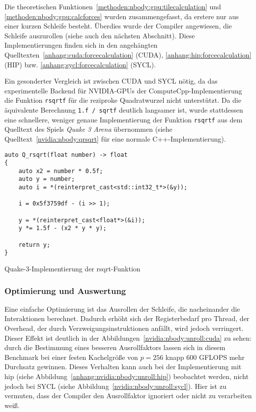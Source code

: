 Die theoretischen Funktionen~\ref{methoden:nbody:gpu:tilecalculation} und
\ref{methoden:nbody:gpu:calcforces} wurden zusammengefasst, da erstere
nur aus einer kurzen Schleife besteht. Überdies wurde der Compiler angewiesen,
die Schleife auszurollen (siehe auch den nächsten Abschnitt). Diese
Implementierungen finden sich in den angehängten
Quelltexten~\ref{anhang:cuda:forcecalculation} (CUDA),
\ref{anhang:hip:forcecalculation} (HIP) bzw. \ref{anhang:sycl:forcecalculation}
(SYCL).

Ein gesonderter Vergleich ist zwischen CUDA und SYCL nötig, da das
experimentelle Backend für NVIDIA-GPUs der ComputeCpp-Implementierung die
Funktion \texttt{rsqrtf} für die reziproke Quadratwurzel nicht unterstützt. Da
die äquivalente Berechnung \texttt{1.f / sqrtf} deutlich langsamer ist, wurde
stattdessen eine schnellere, weniger genaue Implementierung der Funktion
\texttt{rsqrtf} aus dem Quelltext des Spiels \textit{Quake 3 Arena} übernommen
(siehe Quelltext~\ref{nvidia:nbody:qrsqrt} für eine normale
C++-Implementierung).

\begin{code}
    \begin{verbatim}
auto Q_rsqrt(float number) -> float
{
    auto x2 = number * 0.5f;
    auto y = number;
    auto i = *(reinterpret_cast<std::int32_t*>(&y));

    i = 0x5f3759df - (i >> 1);

    y = *(reinterpret_cast<float*>(&i));
    y *= 1.5f - (x2 * y * y);

    return y;
}
    \end{verbatim}
    \caption{Quake-3-Implementierung der rsqrt-Funktion}
    \label{nvidia:nbody:qrsqrt}
\end{code}

\subsubsection{Optimierung und Auswertung}
\label{nvidia:nbody:auswertung}

Eine einfache Optimierung ist das Ausrollen der Schleife, die nacheinander die
Interaktionen berechnet. Dadurch erhöht sich der Registerbedarf pro Thread, der
Overhead, der durch Verzweigungsinstruktionen anfällt, wird jedoch verringert.
Dieser Effekt ist deutlich in der Abbildungen~\ref{nvidia:nbody:unroll:cuda} zu
sehen:  durch die Bestimmung eines besseren Ausrollfaktors lassen sich in diesem
Benchmark bei einer festen Kachelgröße von $p = 256$ knapp \num{600} GFLOPS mehr
Durchsatz gewinnen. Dieses Verhalten kann auch bei der Implementierung mit
\gls{hip} (siehe Abbildung~\ref{anhang:nvidia:nbody:unroll:hip}) beobachtet
werden, nicht jedoch bei SYCL (siehe
Abbildung~\ref{nvidia:nbody:unroll:sycl}). Hier ist zu vermuten, dass der
Compiler den Ausrollfaktor ignoriert oder nicht zu verarbeiten weiß.

